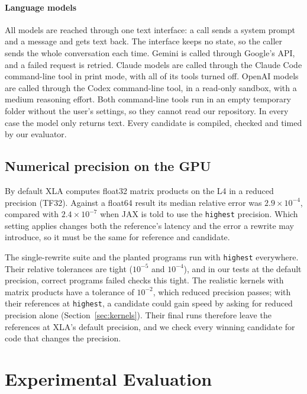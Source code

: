 \documentclass[conference]{IEEEtran}
\begin{document}
\paragraph{Language models}
All models are reached through one text interface: a call sends a system
prompt and a message and gets text back. The interface keeps no state, so
the caller sends the whole conversation each time. Gemini is called through
Google's API, and a failed request is retried. Claude models are called
through the Claude Code command-line tool in print mode, with all of its
tools turned off. OpenAI models are called through the Codex command-line
tool, in a read-only sandbox, with a medium reasoning effort.
Both command-line tools run in an empty temporary folder without the user's
settings, so they cannot read our repository. In every case the model only
returns text. Every candidate is compiled, checked and timed by our
evaluator.


\subsection{Numerical precision on the GPU}
By default XLA computes float32 matrix products on the L4 in a reduced
precision (TF32). Against a float64 result its median relative error was
$2.9\times10^{-4}$, compared with $2.4\times10^{-7}$ when JAX is told to use
the \texttt{highest} precision. Which setting applies changes both the
reference's latency and the error a rewrite may introduce, so it must be the
same for reference and candidate.

The single-rewrite suite and the planted programs run with \texttt{highest}
everywhere. Their relative tolerances are tight ($10^{-5}$ and $10^{-4}$),
and in our tests at the default precision, correct programs failed checks
this tight. The realistic kernels with matrix products have a tolerance of
$10^{-2}$, which reduced precision passes; with their
references at \texttt{highest}, a candidate could gain speed by asking for
reduced precision alone (Section~\ref{sec:kernels}). Their final runs
therefore leave the references at XLA's default precision, and we check every
winning candidate for code that changes the precision.

\section{Experimental Evaluation}
\label{sec:evaluation}
\end{document}
